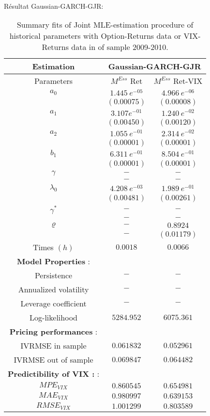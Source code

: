 \documentclass[preprint,times,12pt]{elsarticle}
\begin{document}
\newpage
R\'esultat Gaussian-GARCH-GJR:
\begin{table}[ht]
\centering
\begin{tabular}{|c|c|c|}
\hline
Estimation            &\multicolumn{2}{c|}{ Gaussian-GARCH-GJR} \\ \hline

Parameters               &  \footnotesize{$M^{Ess}$ Ret}  &  \footnotesize{$M^{Ess}$ Ret-VIX}  \\ \hline
\textbf{$a_{0}$}      &$1.445\ e^{-05}$ & $4.966\ e^{-06}$\\
     &$(0.00075)$ &$(0.00008)$  \\
\textbf{$a_{1}$}      &$3.107 e^{-01}$& $1.240\ e^{-02}$ \\ 
    &$(0.00450)$ &$(0.00120)$ \\
\textbf{$a_{2}$}      &$1.055\ e^{-01}$& $2.314\ e^{-02}$ \\ 
     &$(0.00001)$ &$(0.00001)$  \\
\textbf{$b_{1}$}      &$6.311 \ e^{-01}$&$8.504\ e^{-01}$ \\
    &$(0.00001)$ &$(0.00001)$ \\
\textbf{$\gamma$}     &$-$ & $-$\\ 
     &$-$ &$-$ \\
\textbf{$\lambda_{0}$}      &$4.208\ e^{-03}$ &  $ 1.989\ e^{-01}$ \\   
     &$(0.00481)$ &$(0.00261)$\\
\textbf{$\gamma^{*}$}     &$-$ & $-$ \\ 
     &$-$ &$-$  \\
\textbf{$\varrho$}     &$-$ &  $0.8924$\\ 
     &$-$ &$(0.01179)$\\[0.1cm] 
 Times $ (h) $ &$0.0018$ &$0.0066$ \\ [0.1cm] 
\textbf{Model Properties} :  & & \\ 
Persistence           &$-$  &$-$\\ 
Annualized volatility & $-$ &$-$  \\
Leverage coefficient   &$-$ &$-$ \\
Log-likelihood   &$5284.952$ &$6075.361$\\
\textbf{Pricing performances} :  & &  \\ 
IVRMSE in sample             &$0.061832$ &$0.052961$ \\
IVRMSE out of sample         &$0.069847$&$0.064482$ \\
\textbf{Predictibility of VIX :} :  & & \\ 
$ MPE_{VIX} $   &$0.860545$  &$0.654981$\\ 
$ MAE_{VIX} $   & $0.980997$&$0.639153$ \\
$ RMSE_{VIX} $  &$1.001299$&$0.803589$\\ \hline 
\bottomrule
\end{tabular}\hspace*{-1cm}
\begin{small}
\caption{Summary fits of Joint MLE-estimation procedure  of historical parameters with Option-Returns data or  VIX-Returns data  in of sample 2009-2010.}
\label{TableMMLE2009all}
\end{small}
\end{table}
\end{document}
